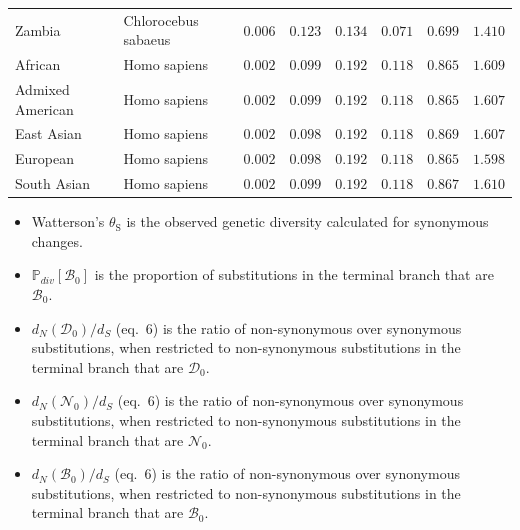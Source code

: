 \documentclass{article}
\newcommand{\proba}{\mathbb{P}}
\newcommand{\dn}{d_N}
\newcommand{\ds}{d_S}
\newcommand{\SphyDel}{\mathcal{D}_0}
\newcommand{\SphyNeu}{\mathcal{N}_0}
\newcommand{\SphyBen}{\mathcal{B}_0}
\newcommand{\thetaSyn}{\theta_{\text{S}}}
\begin{document}
\begin{center}
\begin{longtable*}{|l|l|r|r|r|r|r|r|}
             Zambia & Chlorocebus sabaeus &               $ 0.006$ &                    $ 0.123$ &  $ 0.134$ &            $ 0.071$ &                $ 0.699$ &           $ 1.410$ \\
            African &        Homo sapiens &               $ 0.002$ &                    $ 0.099$ &  $ 0.192$ &            $ 0.118$ &                $ 0.865$ &           $ 1.609$ \\
            Admixed American &        Homo sapiens &               $ 0.002$ &                    $ 0.099$ &  $ 0.192$ &            $ 0.118$ &                $ 0.865$ &           $ 1.607$ \\
            East Asian &        Homo sapiens &               $ 0.002$ &                    $ 0.098$ &  $ 0.192$ &            $ 0.118$ &                $ 0.869$ &           $ 1.607$ \\
            European &        Homo sapiens &               $ 0.002$ &                    $ 0.098$ &  $ 0.192$ &            $ 0.118$ &                $ 0.865$ &           $ 1.598$ \\
            South Asian &        Homo sapiens &               $ 0.002$ &                    $ 0.099$ &  $ 0.192$ &            $ 0.118$ &                $ 0.867$ &           $ 1.610$ \\
        \end{longtable*}
    \end{center}
    \begin{itemize}
        \item Watterson's $\thetaSyn$ is the observed genetic diversity calculated for synonymous changes.
        \item $\proba_{div}[\SphyBen]$ is the proportion of substitutions in the terminal branch that are $\SphyBen$.
        \item $\dn(\SphyDel) / \ds$ (eq.~6) is the ratio of non-synonymous over synonymous substitutions, when restricted to non-synonymous substitutions in the terminal branch that are $\SphyDel$.
        \item $\dn(\SphyNeu) / \ds$ (eq.~6) is the ratio of non-synonymous over synonymous substitutions, when restricted to non-synonymous substitutions in the terminal branch that are $\SphyNeu$.
        \item $\dn(\SphyBen) / \ds$ (eq.~6) is the ratio of non-synonymous over synonymous substitutions, when restricted to non-synonymous substitutions in the terminal branch that are $\SphyBen$.
    \end{itemize}
\end{document}
